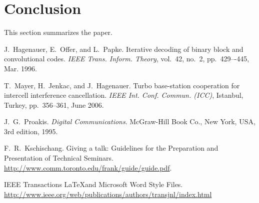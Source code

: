 \documentclass[journal, a4paper]{IEEEtran}
\begin{document}
\section{Conclusion}
	This section summarizes the paper.

\begin{thebibliography}{5}

	J.~Hagenauer, E.~Offer, and L.~Papke. Iterative decoding of binary block
	and convolutional codes. {\em IEEE Trans. Inform. Theory},
	vol.~42, no.~2, pp.~429–-445, Mar. 1996.

	T.~Mayer, H.~Jenkac, and J.~Hagenauer. Turbo base-station cooperation for intercell interference cancellation. {\em IEEE Int. Conf. Commun. (ICC)}, Istanbul, Turkey, pp.~356--361, June 2006.

	J.~G.~Proakis. {\em Digital Communications}. McGraw-Hill Book Co.,
	New York, USA, 3rd edition, 1995.

	F.~R.~Kschischang. Giving a talk: Guidelines for the Preparation and Presentation of Technical Seminars.
	\url{http://www.comm.toronto.edu/frank/guide/guide.pdf}.

	IEEE Transactions \LaTeX and Microsoft Word Style Files.
	\url{http://www.ieee.org/web/publications/authors/transjnl/index.html}

\end{thebibliography}

\end{document}
